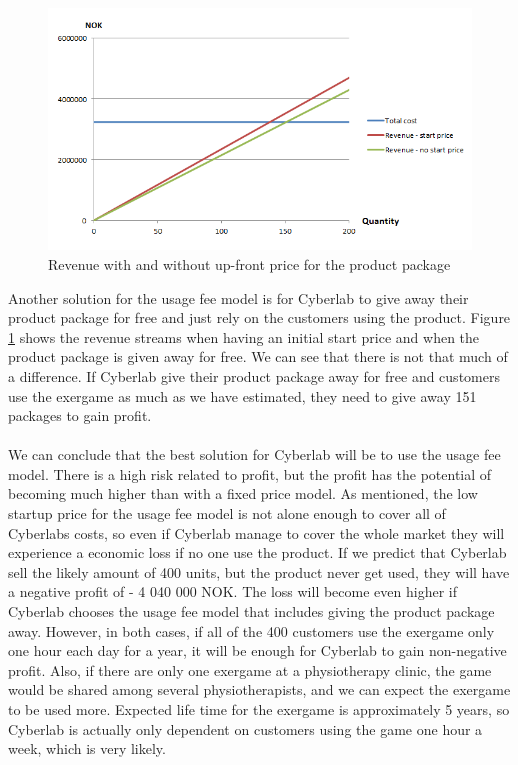 \begin{figure}
\begin{center}
\includegraphics[scale=0.8]{usagewithwithoutstartprice}
\caption[Usage fee example]{Revenue with and without up-front price for the product package}
\label{fig:UsageWithWithout}
\end{center}
\end{figure}
Another solution for the usage fee model is for Cyberlab to give away their product package for free and just rely on the customers using the product. Figure \ref{fig:UsageWithWithout} shows the revenue streams when having an initial start price and when the product package is given away for free. We can see that there is not that much of a difference. If Cyberlab give their product package away for free and customers use the exergame as much as we have estimated, they need to give away 151 packages    to gain profit. \\ \\
We can conclude that the best solution for Cyberlab will be to use the usage fee model. There is a high risk related to profit, but the profit has the potential of becoming much higher than with a fixed price model. As mentioned, the low startup price for the usage fee model is not alone enough to cover all of Cyberlabs costs, so even if Cyberlab manage to cover the whole market they will experience a economic loss if no one use the product. If we predict that Cyberlab sell the likely amount of 400 units, but the product never get used, they will have a negative profit of - 4 040 000 NOK. The loss will become even higher if Cyberlab chooses the usage fee model that includes giving the product package away. However, in both cases, if all of the 400 customers use the exergame only one hour each day for a year, it will be enough for Cyberlab to gain non-negative profit. Also, if there are only one exergame at a physiotherapy clinic, the game would be shared among several physiotherapists, and we can expect the exergame to be used more. Expected life time for the exergame is approximately 5 years, so Cyberlab is actually only dependent on customers using the game one hour a week, which is very likely. \\ \\   
